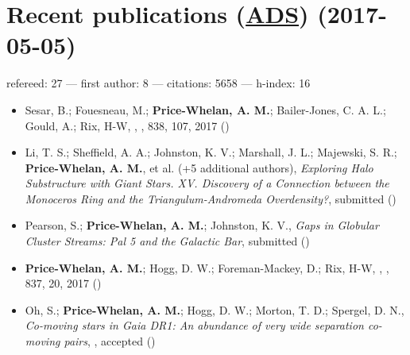 \documentclass[12pt,letterpaper]{article}
\begin{document}
\section*{Recent publications (\href{\adsurl}{ADS}) (2017-05-05)}
    refereed: 27 ---
    first author: 8 ---
    citations: 5658 ---
    h-index: 16

	\begin{itemize}

\item Sesar, B.; Fouesneau, M.; {\bf Price-Whelan, A. M.}; Bailer-Jones, C. A. L.; Gould, A.; Rix, H-W,
    ,
    \apj, 838, 107, 2017 ()

\item Li, T. S.; Sheffield, A. A.; Johnston, K. V.; Marshall, J. L.; Majewski, S. R.; {\bf Price-Whelan, A. M.}, et al. (+5 additional authors),
    {\it Exploring Halo Substructure with Giant Stars. XV. Discovery of a Connection between the Monoceros Ring and the Triangulum-Andromeda Overdensity?},
    submitted ()

\item Pearson, S.; {\bf Price-Whelan, A. M.}; Johnston, K. V.,
    {\it Gaps in Globular Cluster Streams: Pal 5 and the Galactic Bar},
    submitted ()

\item {\bf Price-Whelan, A. M.}; Hogg, D. W.; Foreman-Mackey, D.; Rix, H-W,
    ,
    \apj, 837, 20, 2017 ()

\item Oh, S.; {\bf Price-Whelan, A. M.}; Hogg, D. W.; Morton, T. D.; Spergel, D. N.,
    {\it Co-moving stars in Gaia DR1: An abundance of very wide separation co-moving pairs},
    \apj, accepted ()


\end{itemize}
\end{document}
